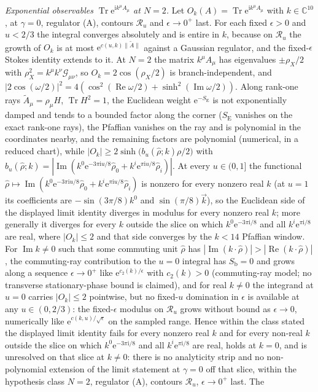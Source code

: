 \emph{Exponential observables \(\operatorname{Tr}\mathrm e^{\mathrm ik^\mu A_\mu}\) at \(N=2\).} Let \(O_k(A)=\operatorname{Tr}\mathrm e^{\mathrm ik^\mu A_\mu}\) with \(k\in\mathbb C^{10}\), at \(\gamma=0\), regulator (A), contours \(\mathcal R_u\) and \(\epsilon\to0^+\) last. For each fixed \(\epsilon>0\) and \(u<2/3\) the integral converges absolutely and is entire in \(k\), because on \(\mathcal R_u\) the growth of \(O_k\) is at most \(\mathrm e^{c(u,k)\|\tilde A\|}\) against a Gaussian regulator, and the fixed-\(\epsilon\) Stokes identity extends to it. At \(N=2\) the matrix \(k^\mu A_\mu\) has eigenvalues \(\pm\rho_X/2\) with \(\rho_X^2=k^\mu k^\nu\mathcal G_{\mu\nu}\), so \(O_k=2\cos(\rho_X/2)\) is branch-independent, and \(|2\cos(\omega/2)|^2=4(\cos^2(\operatorname{Re}\omega/2)+\sinh^2(\operatorname{Im}\omega/2))\). Along rank-one rays \(\tilde A_\mu=\rho_\mu H\), \(\operatorname{Tr}H^2=1\), the Euclidean weight \(\mathrm e^{-S_{\mathrm E}}\) is not exponentially damped and tends to a bounded factor along the corner (\(S_{\mathrm E}\) vanishes on the exact rank-one rays), the Pfaffian vanishes on the ray and is polynomial in the coordinates nearby, and the remaining factors are polynomial (numerical, in a reduced chart), while \(|O_k|\ge 2\sinh\!\bigl(b_u(\hat\rho;k)\rho/2\bigr)\) with \(b_u(\hat\rho;k)=|\operatorname{Im}(k^0\mathrm e^{-3\pi\mathrm iu/8}\hat\rho_0+k^i\mathrm e^{\pi\mathrm iu/8}\hat\rho_i)|\). At every \(u\in(0,1]\) the functional \(\hat\rho\mapsto\operatorname{Im}(k^0\mathrm e^{-3\pi\mathrm iu/8}\hat\rho_0+k^i\mathrm e^{\pi\mathrm iu/8}\hat\rho_i)\) is nonzero for every nonzero real \(k\) (at \(u=1\) its coefficients are \(-\sin(3\pi/8)k^0\) and \(\sin(\pi/8)\vec k\)), so the Euclidean side of the displayed limit identity diverges in modulus for every nonzero real \(k\); more generally it diverges for every \(k\) outside the slice on which \(k^0\mathrm e^{-3\pi\mathrm i/8}\) and all \(k^i\mathrm e^{\pi\mathrm i/8}\) are real, where \(|O_k|\le2\) and that side converges by the \(k<14\) Pfaffian window. For \(\operatorname{Im}k\ne0\) such that some commuting unit \(\hat\rho\) has \(|\operatorname{Im}(k\cdot\hat\rho)|>|\operatorname{Re}(k\cdot\hat\rho)|\), the commuting-ray contribution to the \(u=0\) integral has \(S_{\mathrm b}=0\) and grows along a sequence \(\epsilon\to0^+\) like \(\mathrm e^{c_2(k)/\epsilon}\) with \(c_2(k)>0\) (commuting-ray model; no transverse stationary-phase bound is claimed), and for real \(k\ne0\) the integrand at \(u=0\) carries \(|O_k|\le2\) pointwise, but no fixed-\(u\) domination in \(\epsilon\) is available at any \(u\in(0,2/3)\): the fixed-\(\epsilon\) modulus on \(\mathcal R_u\) grows without bound as \(\epsilon\to0\), numerically like \(\mathrm e^{c(k,u)/\sqrt\epsilon}\) on the sampled range. Hence within the class stated the displayed limit identity fails for every nonzero real \(k\) and for every non-real \(k\) outside the slice on which \(k^0\mathrm e^{-3\pi\mathrm i/8}\) and all \(k^i\mathrm e^{\pi\mathrm i/8}\) are real, holds at \(k=0\), and is unresolved on that slice at \(k\ne0\): there is no analyticity strip and no non-polynomial extension of the limit statement at \(\gamma=0\) off that slice, within the hypothesis class \(N=2\), regulator (A), contours \(\mathcal R_u\), \(\epsilon\to0^+\) last. The 